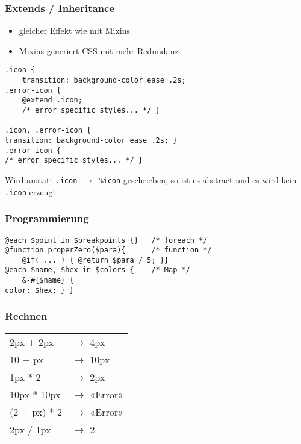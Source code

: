 \subsubsection{Extends / Inheritance}
\begin{itemize}
    \item gleicher Effekt wie mit Mixins
    \item Mixins generiert CSS mit mehr Redundanz
\end{itemize}
\begin{lstlisting}
.icon {
    transition: background-color ease .2s;
.error-icon {
    @extend .icon;
    /* error specific styles... */ }

.icon, .error-icon {
transition: background-color ease .2s; }
.error-icon {
/* error specific styles... */ }
\end{lstlisting}
Wird anstatt \texttt{.icon $\rightarrow$ \%icon} geschrieben, so ist es abstract und es wird kein \texttt{.icon} erzeugt.

\subsubsection{Programmierung}
\begin{lstlisting}
@each $point in $breakpoints {}   /* foreach */
@function properZero($para){      /* function */
    @if( ... ) { @return $para / 5; }}
@each $name, $hex in $colors {    /* Map */
    &-#{$name} {
color: $hex; } }

\end{lstlisting}

\subsubsection{Rechnen}
\begin{tabular}{p{2cm} | l}
    2px + 2px & $\rightarrow$ 4px\\
    10 + px & $\rightarrow$ 10px\\
    1px * 2 & $\rightarrow$ 2px\\
    10px * 10px & $\rightarrow$ «Error»\\
    (2 + px) * 2 & $\rightarrow$ «Error»\\
    2px / 1px & $\rightarrow$ 2\\
\end{tabular}


